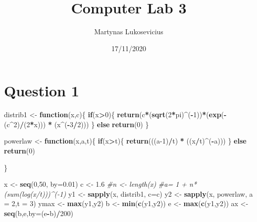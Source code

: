 \documentclass[
]{article}
\title{Computer Lab 3}
\author{Martynas Lukosevicius}
\date{17/11/2020}
\newenvironment{Shaded}{\begin{snugshade}}{\end{snugshade}}
\newcommand{\CommentTok}[1]{\textcolor[rgb]{0.56,0.35,0.01}{\textit{#1}}}
\newcommand{\ControlFlowTok}[1]{\textcolor[rgb]{0.13,0.29,0.53}{\textbf{#1}}}
\newcommand{\DataTypeTok}[1]{\textcolor[rgb]{0.13,0.29,0.53}{#1}}
\newcommand{\DecValTok}[1]{\textcolor[rgb]{0.00,0.00,0.81}{#1}}
\newcommand{\FloatTok}[1]{\textcolor[rgb]{0.00,0.00,0.81}{#1}}
\newcommand{\KeywordTok}[1]{\textcolor[rgb]{0.13,0.29,0.53}{\textbf{#1}}}
\newcommand{\NormalTok}[1]{#1}
\newcommand{\OperatorTok}[1]{\textcolor[rgb]{0.81,0.36,0.00}{\textbf{#1}}}
\newcommand{\StringTok}[1]{\textcolor[rgb]{0.31,0.60,0.02}{#1}}
\begin{document}
\maketitle

\hypertarget{question-1}{%
\section{Question 1}\label{question-1}}

\begin{Shaded}
\begin{Highlighting}[]
\NormalTok{distrib1 <-}\StringTok{ }\ControlFlowTok{function}\NormalTok{(x,c)\{}
  \ControlFlowTok{if}\NormalTok{(x}\OperatorTok{>}\DecValTok{0}\NormalTok{)\{}
    \KeywordTok{return}\NormalTok{(c}\OperatorTok{*}\NormalTok{(}\KeywordTok{sqrt}\NormalTok{(}\DecValTok{2}\OperatorTok{*}\NormalTok{pi)}\OperatorTok{^}\NormalTok{(}\OperatorTok{-}\DecValTok{1}\NormalTok{))}\OperatorTok{*}\NormalTok{(}\KeywordTok{exp}\NormalTok{(}\OperatorTok{-}\NormalTok{(c}\OperatorTok{^}\DecValTok{2}\NormalTok{)}\OperatorTok{/}\NormalTok{(}\DecValTok{2}\OperatorTok{*}\NormalTok{x))) }\OperatorTok{*}\StringTok{ }\NormalTok{(x}\OperatorTok{^}\NormalTok{(}\OperatorTok{-}\DecValTok{3}\OperatorTok{/}\DecValTok{2}\NormalTok{)))}
\NormalTok{  \}}
  \ControlFlowTok{else} \KeywordTok{return}\NormalTok{(}\DecValTok{0}\NormalTok{)}
\NormalTok{\}}

\NormalTok{powerlaw <-}\StringTok{ }\ControlFlowTok{function}\NormalTok{(x,a,t)\{}
  \ControlFlowTok{if}\NormalTok{(x}\OperatorTok{>}\NormalTok{t)\{}
    \KeywordTok{return}\NormalTok{(((a}\DecValTok{-1}\NormalTok{)}\OperatorTok{/}\NormalTok{t) }\OperatorTok{*}\StringTok{ }\NormalTok{((x}\OperatorTok{/}\NormalTok{t)}\OperatorTok{^}\NormalTok{(}\OperatorTok{-}\NormalTok{a)))}
\NormalTok{  \}}
  \ControlFlowTok{else} \KeywordTok{return}\NormalTok{(}\DecValTok{0}\NormalTok{)}
  
\NormalTok{\}}

\NormalTok{x <-}\StringTok{ }\KeywordTok{seq}\NormalTok{(}\DecValTok{0}\NormalTok{,}\DecValTok{50}\NormalTok{, }\DataTypeTok{by=}\FloatTok{0.01}\NormalTok{)}
\NormalTok{c <-}\StringTok{ }\FloatTok{1.6}
\CommentTok{#n <- length(x)}
\CommentTok{#a= 1 + n*(sum(log(x/t)))^(-1)}
\NormalTok{y1 <-}\StringTok{ }\KeywordTok{sapply}\NormalTok{(x, distrib1, }\DataTypeTok{c=}\NormalTok{c)}
\NormalTok{y2 <-}\StringTok{ }\KeywordTok{sapply}\NormalTok{(x, powerlaw, }\DataTypeTok{a =} \DecValTok{2}\NormalTok{,}\DataTypeTok{t =} \DecValTok{3}\NormalTok{)}
\NormalTok{ymax <-}\StringTok{ }\KeywordTok{max}\NormalTok{(y1,y2)}
\NormalTok{b <-}\StringTok{ }\KeywordTok{min}\NormalTok{(}\KeywordTok{c}\NormalTok{(y1,y2))}
\NormalTok{e <-}\StringTok{ }\KeywordTok{max}\NormalTok{(}\KeywordTok{c}\NormalTok{(y1,y2))}
\NormalTok{ax <-}\StringTok{ }\KeywordTok{seq}\NormalTok{(b,e,}\DataTypeTok{by=}\NormalTok{(e}\OperatorTok{-}\NormalTok{b)}\OperatorTok{/}\DecValTok{200}\NormalTok{)}


\end{Highlighting}
\end{Shaded}
\end{document}
